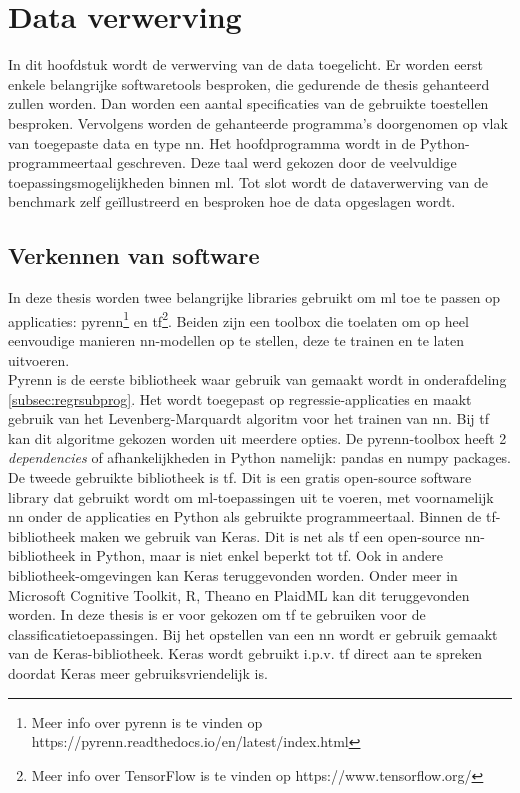 \chapter{Data verwerving}

In dit hoofdstuk wordt de verwerving van de data toegelicht. Er worden eerst enkele belangrijke softwaretools besproken, die gedurende de thesis gehanteerd zullen worden. Dan worden een aantal specificaties van de gebruikte toestellen besproken. Vervolgens worden de gehanteerde programma's doorgenomen op vlak van toegepaste data en type \gls{nn}. Het hoofdprogramma wordt in de Python-programmeertaal geschreven. Deze taal werd gekozen door de veelvuldige toepassingsmogelijkheden binnen \gls{ml}. Tot slot wordt de dataverwerving van de benchmark zelf ge\"illustreerd en besproken hoe de data opgeslagen wordt.

\section{Verkennen van software}

In deze thesis worden twee belangrijke libraries gebruikt om \gls{ml} toe te passen op applicaties: pyrenn\footnote{Meer info over pyrenn is te vinden op https://pyrenn.readthedocs.io/en/latest/index.html } en \gls{tf}\footnote{Meer info over TensorFlow is te vinden op https://www.tensorflow.org/ }. Beiden zijn een toolbox die toelaten om op heel eenvoudige manieren \gls{nn}-modellen op te stellen,  deze te trainen en te laten uitvoeren. \\
Pyrenn is de eerste bibliotheek waar gebruik van gemaakt wordt in onderafdeling \ref{subsec:regrsubprog}. Het wordt toegepast op regressie-applicaties en maakt gebruik van het Levenberg-Marquardt algoritm voor het trainen van \gls{nn}. Bij \gls{tf} kan dit algoritme gekozen worden uit meerdere opties. De pyrenn-toolbox heeft 2 \textit{dependencies} of afhankelijkheden in Python namelijk: pandas en numpy packages. \\

De tweede gebruikte bibliotheek is \gls{tf}. Dit is een gratis open-source software library dat gebruikt wordt om \gls{ml}-toepassingen uit te voeren, met voornamelijk \gls{nn} onder de applicaties en Python als gebruikte programmeertaal. Binnen de \gls{tf}-bibliotheek maken we gebruik van Keras. Dit is net als \gls{tf} een open-source \gls{nn}-bibliotheek in Python, maar is niet enkel beperkt tot \gls{tf}. Ook in andere bibliotheek-omgevingen kan Keras teruggevonden worden. Onder meer in Microsoft Cognitive Toolkit, R, Theano en PlaidML kan dit teruggevonden worden\cite{bron:kerasbackend}. In deze thesis is er voor gekozen om \gls{tf} te gebruiken voor de classificatietoepassingen. Bij het opstellen van een \gls{nn} wordt er gebruik gemaakt van de Keras-bibliotheek. Keras wordt gebruikt i.p.v. \gls{tf} direct aan te spreken doordat Keras meer gebruiksvriendelijk is.
